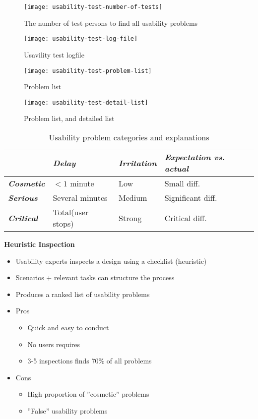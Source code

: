 \begin{figure}
	\texttt{[image: usability-test-number-of-tests]}
	\caption{The number of test persons to find all usability problems}
	\label{fig:usability-test-number-of-tests}
\end{figure}
\begin{figure*}
	\texttt{[image: usability-test-log-file]}
	\caption{Usavility test logfile}
	\label{fig:usability-test-log-file}
\end{figure*}
\begin{figure*}
	\texttt{[image: usability-test-problem-list]}
	\caption{Problem list}
	\label{fig:usability-test-problem-list}
\end{figure*}
\begin{figure*}
	\texttt{[image: usability-test-detail-list]}
	\caption{Problem list, and detailed list}
	\label{fig:usability-test-detail-list}
\end{figure*}
\begin{table*}
	\centering
	\begin{tabular}{llll}
		\toprule
		 & \textbf{\textit{Delay}} & \textbf{\textit{Irritation}} & \textbf{\textit{Expectation vs. actual}} \\ \midrule
		 \textbf{\textit{Cosmetic}} & $<1$ minute & Low & Small diff.\\
		 \textbf{\textit{Serious}} & Several minutes & Medium & Significant diff.\\
		 \textbf{\textit{Critical}} & Total(user stops) & Strong & Critical diff.\\\bottomrule
	\end{tabular}
	\caption{Usability problem categories and explanations}
	\label{tbl:usability-problems-categories}
\end{table*}
\clearpage
\textbf{Heuristic Inspection}\\
\begin{itemize}
	\item Usability experts inspects a design using a checklist (heuristic)
	\item Scenarios + relevant tasks can structure the process
	\item Produces a ranked list of usability problems
	\item Pros
	\begin{itemize}
		\item Quick and easy to conduct
		\item No users requires
		\item 3-5 inspections finds 70\% of all problems
	\end{itemize}
	\item Cons
	\begin{itemize}
		\item High proportion of ''cosmetic'' problems
		\item ''False'' usability problems
	\end{itemize}
\end{itemize}
